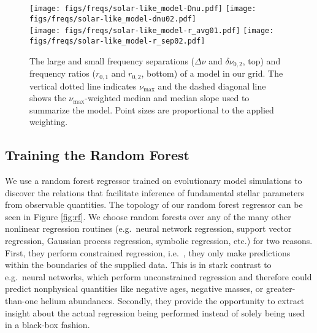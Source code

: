 \documentclass[manuscript]{aastex}
\begin{document}
\begin{figure*}
    \centering
    \texttt{[image: figs/freqs/solar-like\_model-Dnu.pdf]}\hfill
    \texttt{[image: figs/freqs/solar-like\_model-dnu02.pdf]}\\
    \texttt{[image: figs/freqs/solar-like\_model-r\_avg01.pdf]}\hfill
    \texttt{[image: figs/freqs/solar-like\_model-r\_sep02.pdf]}%
    \caption{The large and small frequency separations ($\Delta\nu$ and $\delta\nu_{0,2}$, top) and frequency ratios ($r_{0,1}$ and $r_{0,2}$, bottom) of a model in our grid. %
    The vertical dotted line indicates $\nu_{\max}$ and the dashed diagonal line shows the $\nu_{\max}$-weighted median and median slope used to summarize the model. Point sizes are proportional to the applied weighting.}%
    \label{fig:ratios}
\end{figure*}

\subsection{Training the Random Forest} \label{sec:forest}
We use a random forest regressor trained on evolutionary model simulations to discover the relations that facilitate inference of fundamental stellar parameters from observable quantities. The topology of our random forest regressor can be seen in Figure \ref{fig:rf}. We choose random forests over any of the many other nonlinear regression routines (e.g.~neural network regression, support vector regression, Gaussian process regression, symbolic regression, etc.) for two reasons. First, they perform constrained regression, i.e.~, they only make predictions within the boundaries of the supplied data. This is in stark contrast to e.g.~neural networks, which perform unconstrained regression and therefore could predict nonphysical quantities like negative ages, negative masses, or greater-than-one helium abundances. Secondly, they provide the opportunity to extract insight about the actual regression being performed instead of solely being used in a black-box fashion. 
\end{document}
